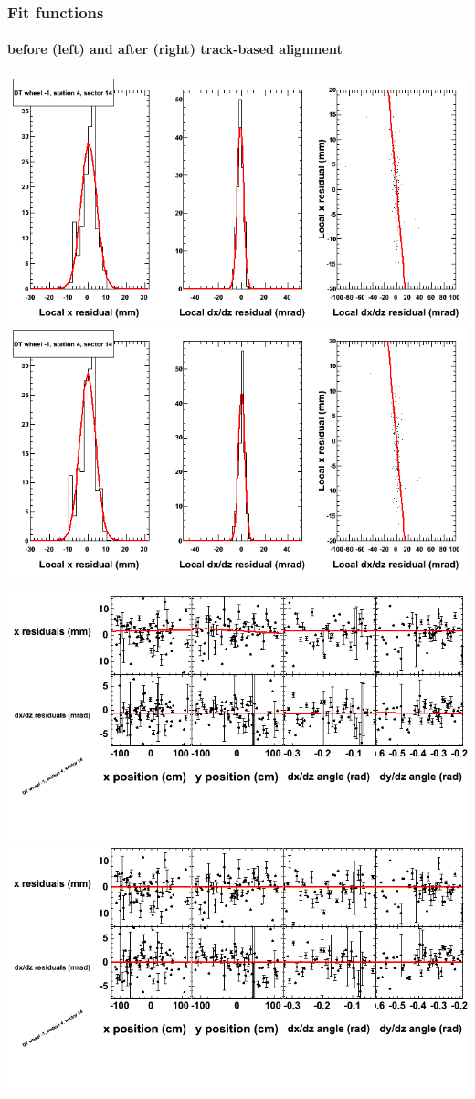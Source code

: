 \documentclass[compress]{beamer}
\begin{document}
\begin{frame}
\frametitle{Fit functions}
\framesubtitle{before (left) and after (right) track-based alignment}
\includegraphics[width=0.5\linewidth]{fitfunctions_re01/MBwhBst4sec14_bellcurves.png} \includegraphics[width=0.5\linewidth]{fitfunctions_re05/MBwhBst4sec14_bellcurves.png}

\includegraphics[width=0.5\linewidth]{fitfunctions_re01/MBwhBst4sec14_polynomials.png} \includegraphics[width=0.5\linewidth]{fitfunctions_re05/MBwhBst4sec14_polynomials.png}
\end{frame}
\end{document}
